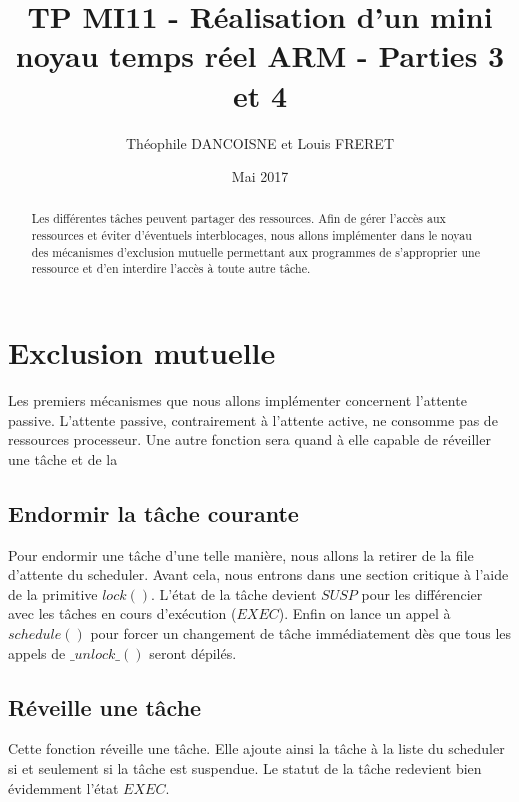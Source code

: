 \documentclass{article}
\title{TP MI11 - Réalisation d’un mini noyau temps réel ARM - Parties 3 et 4}
\author{Théophile DANCOISNE et Louis FRERET}
\date{Mai 2017}
\begin{document}
\maketitle

\begin{abstract}
Les différentes tâches peuvent partager des ressources. Afin de gérer l'accès aux ressources et éviter d'éventuels interblocages, nous allons implémenter dans le noyau des mécanismes d'exclusion mutuelle permettant aux programmes de s'approprier une ressource et d'en interdire l'accès à toute autre tâche.
\end{abstract}

\section{Exclusion mutuelle}
Les premiers mécanismes que nous allons implémenter concernent l'attente passive. L'attente passive, contrairement à l'attente active, ne consomme pas de ressources processeur.
Une autre fonction sera quand à elle capable de réveiller une tâche et de la 

\subsection{Endormir la tâche courante}
Pour endormir une tâche d'une telle manière, nous allons la retirer de la file d'attente du scheduler. Avant cela, nous entrons dans une section critique à l'aide de la primitive $lock()$. L'état de la tâche devient $SUSP$ pour les différencier avec les tâches en cours d'exécution ($EXEC$). Enfin on lance un appel à $schedule()$ pour forcer un changement de tâche immédiatement dès que tous les appels de $\_unlock\_()$ seront dépilés.


\subsection{Réveille une tâche}
Cette fonction réveille une tâche. Elle ajoute ainsi la tâche à la liste du scheduler si et seulement si la tâche est suspendue. Le statut de la tâche redevient bien évidemment l'état $EXEC$.

\end{document}
